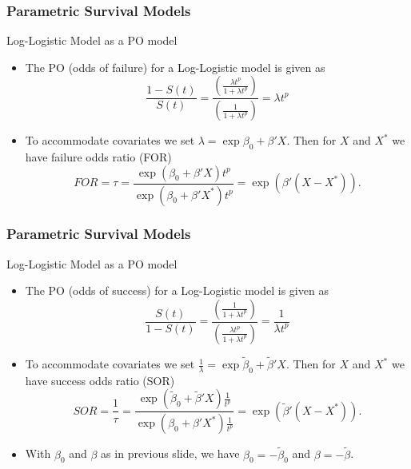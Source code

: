 \documentclass{beamer}
\theoremstyle{definition}
\begin{document}
\begin{frame}
\frametitle{Parametric Survival Models}
\begin{block}{Log-Logistic Model as a PO model}
\begin{itemize}
\item The PO (odds of failure) for a Log-Logistic model is given as
\[
\frac{1-S(t)}{S(t)} = \frac{\left(\frac{\lambda t^p}{1+\lambda t^p}\right)}{\left(\frac{1}{1+\lambda t^p}\right)} = \lambda t^p
\]
\item To accommodate covariates we set $\lambda=\exp{\beta_0 + \beta'X}$.
Then for $X$ and $X^*$ we have failure odds ratio (FOR)
\[
FOR = \tau = \frac{\exp(\beta_0 + \beta'X)t^p}{\exp(\beta_0 + \beta'X^*)t^p} = \exp(\beta'(X-X^*)).
\]
\end{itemize}
\end{block}
\end{frame}

\begin{frame}
\frametitle{Parametric Survival Models}
\begin{block}{Log-Logistic Model as a PO model}
\begin{itemize}
\item The PO (odds of success) for a Log-Logistic model is given as
\[
\frac{S(t)}{1 -S(t)} = \frac{\left(\frac{1}{1+\lambda t^p}\right)}{\left(\frac{\lambda t^p}{1+\lambda t^p}\right)} = \frac{1}{\lambda t^p}
\]
\item To accommodate covariates we set $\frac{1}{\lambda}=\exp{\tilde{\beta}_0 + \tilde{\beta}'X}$.
Then for $X$ and $X^*$ we have success odds ratio (SOR)
\[
SOR = \frac{1}{\tau} = \frac{\exp(\tilde{\beta}_0 + \tilde{\beta}'X)\frac{1}{t^p}}{\exp(\beta_0 + \beta'X^*)\frac{1}{t^p}} = \exp(\tilde{\beta}'(X-X^*)).
\]
\item With $\beta_0$ and $\beta$ as in previous slide, we have $\beta_0 = -\tilde{\beta}_0$ and $\beta = -\tilde{\beta}$.
\end{itemize}
\end{block}
\end{frame}
\end{document}
